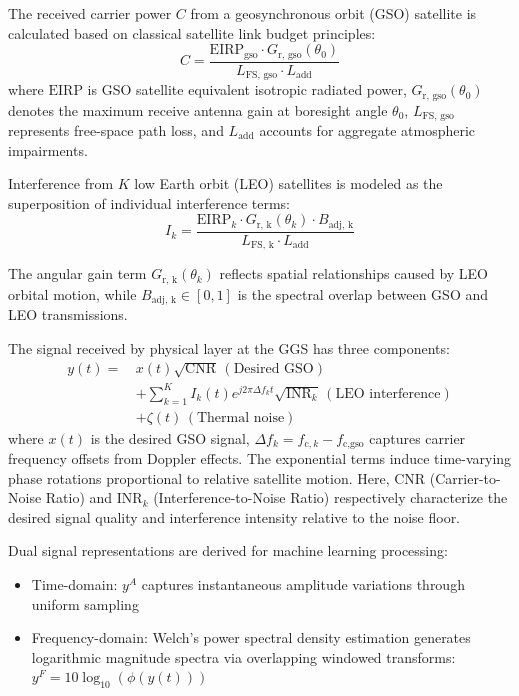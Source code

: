 \documentclass[conference]{IEEEtran}
\begin{document}
The received carrier power $C$ from a geosynchronous orbit (GSO) satellite is calculated based on classical satellite link budget principles:
\begin{equation}
    C = \frac{\text{EIRP}_{\text{gso}} \cdot G_{\text{r, gso}}(\theta_0)}{L_{\text{FS, gso}} \cdot L_{\text{add}}}
    \label{eq:carrier_power}
\end{equation}
where $\text{EIRP}$ is GSO satellite equivalent isotropic radiated power, $G_{\text{r, gso}}(\theta_0)$ denotes the maximum receive antenna gain at boresight angle $\theta_0$, $L_{\text{FS, gso}}$ represents free-space path loss, and $L_{\text{add}}$ accounts for aggregate atmospheric impairments.

Interference from $K$ low Earth orbit (LEO) satellites is modeled as the superposition of individual interference terms:
\begin{equation}
    I_k = \frac{\text{EIRP}_k \cdot G_{\text{r, k}}(\theta_k) \cdot B_{\text{adj, k}}}{L_{\text{FS, k}} \cdot L_{\text{add}}}
    \label{eq:interference_power}
\end{equation}

The angular gain term $G_{\text{r, k}}(\theta_k)$ reflects spatial relationships caused by LEO orbital motion, while $B_{\text{adj, k}} \in [0,1]$ is the spectral overlap between GSO and LEO transmissions.

The signal received by physical layer at the GGS has three components:
\begin{align}
    y(t) =\, & x(t)\sqrt{\text{CNR}}\, (\text{Desired GSO}) \nonumber                                                 \\[0.5em]
             & + \sum_{k=1}^{K} I_k(t)e^{j2\pi \Delta f_k t}\sqrt{\text{INR}_k}\, (\text{LEO interference}) \nonumber \\[0.5em]
             & + \zeta(t)\, (\text{Thermal noise})
\end{align}
where $x(t)$  is the desired GSO signal, $\Delta f_k = f_{\text{c},k} - f_{\text{c,gso}}$ captures carrier frequency offsets from Doppler effects. The exponential terms induce time-varying phase rotations proportional to relative satellite motion. Here, $\text{CNR}$ (Carrier-to-Noise Ratio) and $\text{INR}_k$ (Interference-to-Noise Ratio) respectively characterize the desired signal quality and interference intensity relative to the noise floor.

Dual signal representations are derived for machine learning processing:
\begin{itemize}
    \item Time-domain: $y^A$ captures instantaneous amplitude variations through uniform sampling
    \item Frequency-domain: Welch's power spectral density estimation generates logarithmic magnitude spectra via overlapping windowed transforms: $y^F = 10\log_{10}(\phi(y(t)))$
\end{itemize}
\end{document}
